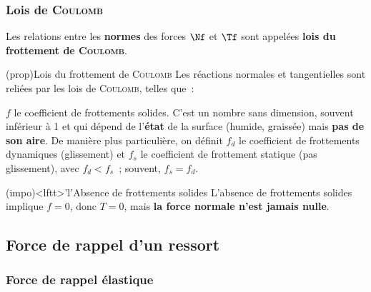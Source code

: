 \documentclass[../../main/main.tex]{subfiles}
\begin{document}
\subsubsection{Lois de \textsc{Coulomb}}
Les relations entre les \textbf{normes} des forces $\Nf$ et $\Tf$ sont appelées
\textbf{lois du frottement de \textsc{Coulomb}}.

\begin{tcb*}(prop){Lois du frottement de \textsc{Coulomb}}
	Les réactions normales et tangentielles sont reliées par les lois de
	\textsc{Coulomb}, telles que~:
	\smallbreak
	\begin{isd}
		\psw{
			\[
				\norm{\Tf} = f\norm{\Nf}
				\qou
				\norm{\Tf} = f_d \norm{\Nf}
			\]
		}
		\tcblower
	\end{isd}
	$f$ le coefficient de frottements solides. C'est un nombre sans
	dimension, souvent inférieur à 1 et qui dépend de l'\textbf{état} de la
	surface (humide, graissée) mais \textbf{pas de son aire}.
	\bigbreak
	De manière plus particulière, on définit $f_d$ le coefficient de frottements
	dynamiques (glissement) et $f_s$ le coefficient de frottement statique (pas
	glissement), avec $f_d < f_s$~; souvent, $f_s = f_d$.
\end{tcb*}

\begin{tcb*}(impo)<lftt>'l'{Absence de frottements solides}
	L'absence de frottements solides implique $f=0$, donc $T = 0$, mais
	\textbf{la force normale n'est jamais nulle}.
\end{tcb*}

\subsection{Force de rappel d'un ressort}
\subsubsection{Force de rappel élastique}
\end{document}
